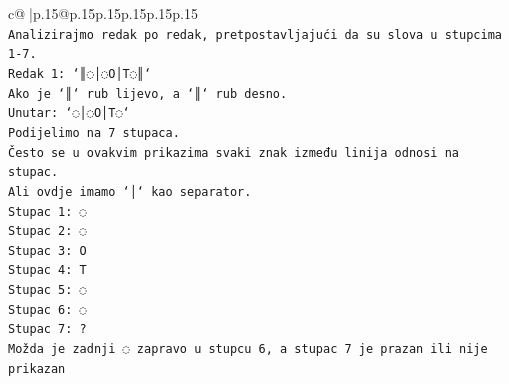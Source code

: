 \documentclass{article}
\begin{document}
{\begin{supertabular}{c@{$\;$}|p{.15\linewidth}@{}p{.15\linewidth}p{.15\linewidth}p{.15\linewidth}p{.15\linewidth}p{.15\linewidth}}
{{{\\ 
\texttt{Analizirajmo redak po redak, pretpostavljajući da su slova u stupcima 1{-}7.} \\
\texttt{Redak 1: `║◌│◌O│T◌║`} \\
\texttt{Ako je `║` rub lijevo, a `║` rub desno.} \\
\texttt{Unutar: `◌│◌O│T◌`} \\
\texttt{Podijelimo na 7 stupaca.} \\
\texttt{Često se u ovakvim prikazima svaki znak između linija odnosi na stupac.} \\
\texttt{Ali ovdje imamo `│` kao separator.} \\
\texttt{Stupac 1: ◌} \\
\texttt{Stupac 2: ◌} \\
\texttt{Stupac 3: O} \\
\texttt{Stupac 4: T} \\
\texttt{Stupac 5: ◌} \\
\texttt{Stupac 6: ◌} \\
\texttt{Stupac 7: ?} \\
\texttt{Možda je zadnji ◌ zapravo u stupcu 6, a stupac 7 je prazan ili nije prikazan} \\
            }
        }
    }
     \\ \\


\end{supertabular}}
\end{document}
